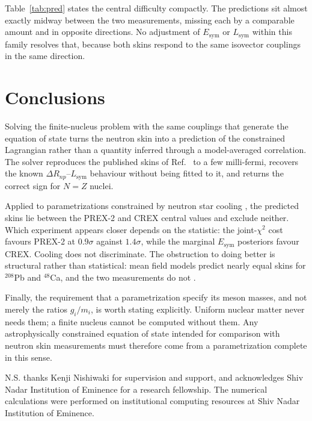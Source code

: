 \documentclass[aps,prc,twocolumn,showpacs,superscriptaddress,floatfix]{revtex4-2}
\newcommand{\Esym}{E_{\mathrm{sym}}}
\newcommand{\Lsym}{L_{\mathrm{sym}}}
\newcommand{\DRnp}{\Delta R_{np}}
\begin{document}
Table~\ref{tab:pred} states the central difficulty compactly. The predictions
sit almost exactly midway between the two measurements, missing each by a
comparable amount and in opposite directions. No adjustment of $\Esym$ or
$\Lsym$ within this family resolves that, because both skins respond to the same
isovector couplings in the same direction.

\section{Conclusions}

Solving the finite-nucleus problem with the same couplings that generate the
equation of state turns the neutron skin into a prediction of the constrained
Lagrangian rather than a quantity inferred through a model-averaged correlation.
The solver reproduces the published skins of Ref.~\cite{Das2021} to a few
milli-fermi, recovers the known $\DRnp$--$\Lsym$ behaviour without being fitted
to it, and returns the correct sign for $N=Z$ nuclei.

Applied to parametrizations constrained by neutron star cooling \cite{PaperI},
the predicted skins lie between the PREX-2 \cite{PREX2} and CREX \cite{CREX}
central values and exclude neither. Which experiment appears closer depends on
the statistic: the joint-$\chi^2$ cost favours PREX-2 at $0.9\sigma$ against
$1.4\sigma$, while the marginal $\Esym$ posteriors favour CREX. Cooling does
not discriminate. The
obstruction to doing better is structural rather than statistical: mean field
models predict nearly equal skins for $^{208}$Pb and $^{48}$Ca, and the two
measurements do not \cite{Reinhard2022}.

Finally, the requirement that a parametrization specify its meson masses, and
not merely the ratios $g_i/m_i$, is worth stating explicitly. Uniform nuclear
matter never needs them; a finite nucleus cannot be computed without them. Any
astrophysically constrained equation of state intended for comparison with
neutron skin measurements must therefore come from a parametrization complete in
this sense.

\begin{acknowledgments}
N.S. thanks Kenji Nishiwaki for supervision and support, and acknowledges Shiv
Nadar Institution of Eminence for a research fellowship. The numerical
calculations were performed on institutional computing resources at Shiv Nadar
Institution of Eminence.
\end{acknowledgments}



\end{document}
